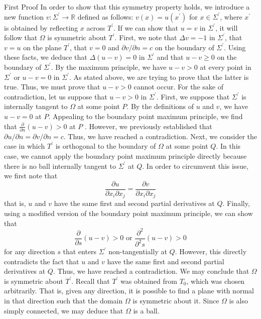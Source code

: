 \documentclass[final]{beamer}
\newlength{\colwidth}
\begin{document}
\begin{frame}[t]
\begin{columns}[t]
\begin{column}{\colwidth}
\begin{block}{First Proof}
    In order to show that this symmetry property holds, we introduce a new function $v: \Sigma^\prime \rightarrow \mathbb{R}$ defined as follows: $v(x) = u(x^\prime)$ for $x \in \Sigma^\prime$, where $x^\prime$ is obtained by reflecting $x$ across $T^\prime$. If we can show that $u = v$ in $\Sigma^\prime$, it will follow that $\Omega$ is symmetric about $T^\prime$. First, we note that $\Delta v = -1$ in $\Sigma^\prime$, that $v = u$ on the plane $T^\prime$, that $v = 0$ and $\partial{v}/\partial{n} = c$ on the boundary of $\Sigma^\prime$. Using these facts, we deduce that $\Delta(u-v) = 0$ in $\Sigma^\prime$ and that $u-v \geq 0$ on the boundary of $\Sigma^\prime$. By the maximum principle, we have $u - v > 0$ at every point in $\Sigma^\prime$ or $u-v = 0$ in $\Sigma^\prime$. As stated above, we are trying to prove that the latter is true. Thus, we must prove that $u-v > 0$ cannot occur. For the sake of contradiction, let us suppose that $u - v > 0$ in $\Sigma^\prime$. First, we suppose that $\Sigma^\prime$ is internally tangent to $\Omega$ at some point $P$. By the definitions of $u$ and $v$, we have $u - v = 0$ at $P$. Appealing to the boundary point maximum principle, we find that $\frac{\partial}{\partial{n}}(u-v) > 0$ at $P$ \cite{weinberger84}. However, we previously established that $\partial{u}/\partial{n} = \partial{v}/\partial{n} = c$. Thus, we have reached a contradiction. Next, we consider the case in which $T^\prime$ is orthogonal to the boundary of $\Omega$ at some point $Q$. In this case, we cannot apply the boundary point maximum principle directly because there is no ball internally tangent to $\Sigma^\prime$ at $Q$. In order to circumvent this issue, we first note that
$$
\frac{\partial{u}}{\partial{x_i}\partial{x_j}} = \frac{\partial{v}}{\partial{x_i}\partial{x_j}}
$$ that is, $u$ and $v$ have the same first and second partial derivatives at $Q$. Finally, using a modified version of the boundary point maximum principle, we can show that
\[
\frac{\partial}{\partial{s}} (u-v) > 0 \text{ or } \frac{\partial^2}{\partial^2{s}}(u-v) > 0
\] for any direction $s$ that enters $\Sigma^\prime$ non-tangentially at $Q$. However, this directly contradicts the fact that $u$ and $v$ have the same first and second partial derivatives at $Q$. Thus, we have reached a contradiction. We may conclude that $\Omega$ is symmetric about $T^\prime$. Recall that $T^\prime$ was obtained from $T_0$, which was chosen arbitrarily. That is, given any direction, it is possible to find a plane with normal in that direction such that the domain $\Omega$ is symmetric about it. Since $\Omega$ is also simply connected, we may deduce that $\Omega$ is a ball.


\end{block}
\end{column}
\end{columns}
\end{frame}
\end{document}

